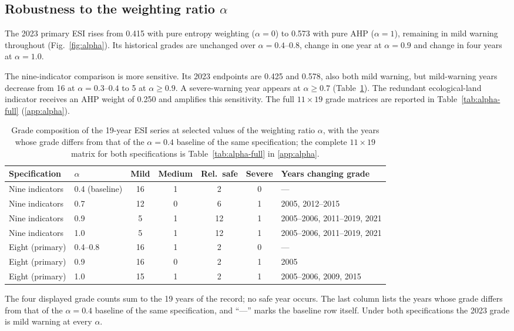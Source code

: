 \documentclass[preprint,11pt,authoryear]{elsarticle}
\begin{document}
\subsection{Robustness to the weighting ratio $\alpha$}
\label{sec:alpha}
The 2023 primary ESI rises from 0.415 with pure entropy weighting ($\alpha=0$) to 0.573 with pure AHP ($\alpha=1$), remaining in mild warning throughout (Fig.~\ref{fig:alpha}). Its historical grades are unchanged over $\alpha=0.4$--$0.8$, change in one year at $\alpha=0.9$ and change in four years at $\alpha=1.0$.

The nine-indicator comparison is more sensitive. Its 2023 endpoints are 0.425 and 0.578, also both mild warning, but mild-warning years decrease from 16 at $\alpha=0.3$--$0.4$ to 5 at $\alpha\ge0.9$. A severe-warning year appears at $\alpha\ge0.7$ (Table~\ref{tab:alpha}). The redundant ecological-land indicator receives an AHP weight of 0.250 and amplifies this sensitivity. The full $11\times19$ grade matrices are reported in Table~\ref{tab:alpha-full} (\ref{app:alpha}).

\begin{table}[htbp]
\centering
\caption{Grade composition of the 19-year ESI series at selected values of the weighting ratio $\alpha$, with the years whose grade differs from that of the $\alpha=0.4$ baseline of the same specification; the complete $11\times19$ matrix for both specifications is Table~\ref{tab:alpha-full} in \ref{app:alpha}.}
\label{tab:alpha}
\small
\setlength{\tabcolsep}{4pt}
\begin{tabular}{llccccl}
\toprule
Specification & $\alpha$ & Mild & Medium & Rel.\ safe & Severe & Years changing grade \\
\midrule
Nine indicators & 0.4 (baseline) & 16 & 1 & 2 & 0 & --- \\
Nine indicators & 0.7 & 12 & 0 & 6 & 1 & 2005, 2012--2015 \\
Nine indicators & 0.9 & 5 & 1 & 12 & 1 & 2005--2006, 2011--2019, 2021 \\
Nine indicators & 1.0 & 5 & 1 & 12 & 1 & 2005--2006, 2011--2019, 2021 \\
Eight (primary) & 0.4--0.8 & 16 & 1 & 2 & 0 & --- \\
Eight (primary) & 0.9 & 16 & 0 & 2 & 1 & 2005 \\
Eight (primary) & 1.0 & 15 & 1 & 2 & 1 & 2005--2006, 2009, 2015 \\
\bottomrule
\end{tabular}

\vspace{2pt}
{\scriptsize The four displayed grade counts sum to the 19 years of the record; no safe year occurs. The last column lists the years whose grade differs from that of the $\alpha=0.4$ baseline of the same specification, and ``---'' marks the baseline row itself. Under both specifications the 2023 grade is mild warning at every $\alpha$.}
\end{table}
\end{document}
